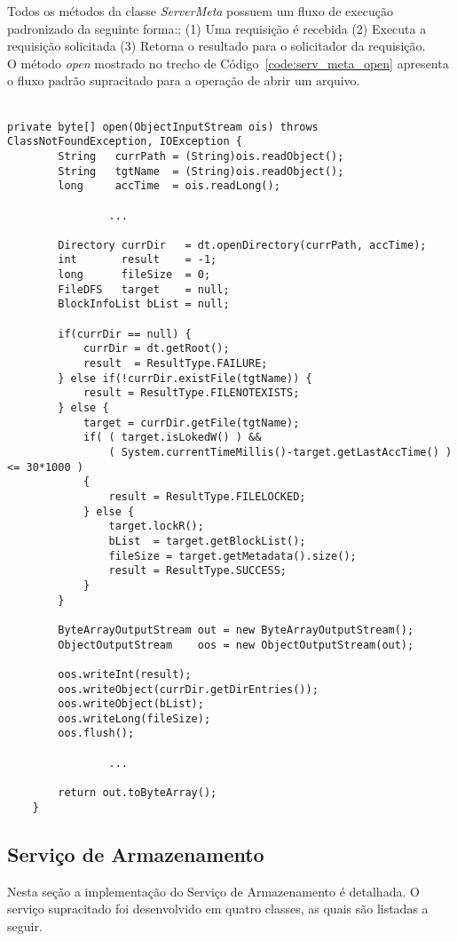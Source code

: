 Todos os métodos da classe \textit{ServerMeta} possuem um fluxo de execução padronizado da seguinte forma:;  (1) Uma requisição é recebida (2) Executa a requisição solicitada (3) Retorna o resultado para o solicitador da requisição. 
\\

O método \textit{open} mostrado no trecho de Código~\ref{code:serv_meta_open} apresenta o fluxo padrão supracitado para a operação de abrir um arquivo.
\\
\\

\begin{lstlisting}[basicstyle=\ttfamily\footnotesize, frame=single, caption=Exemplo de método da classe ServerMeta, label=code:serv_meta_open]		
	private byte[] open(ObjectInputStream ois) throws ClassNotFoundException, IOException {
		String   currPath = (String)ois.readObject();
		String   tgtName  = (String)ois.readObject();
		long     accTime  = ois.readLong();
		
				...
		
		Directory currDir   = dt.openDirectory(currPath, accTime);
		int       result    = -1;
		long      fileSize  = 0;
		FileDFS   target    = null;
		BlockInfoList bList = null;
		
		if(currDir == null) {
			currDir = dt.getRoot();
			result  = ResultType.FAILURE;
		} else if(!currDir.existFile(tgtName)) {
			result = ResultType.FILENOTEXISTS;
		} else {
			target = currDir.getFile(tgtName);
			if( ( target.isLokedW() ) &&
				( System.currentTimeMillis()-target.getLastAccTime() ) <= 30*1000 ) 
			{
				result = ResultType.FILELOCKED;
			} else {
				target.lockR();
				bList  = target.getBlockList();
				fileSize = target.getMetadata().size();
				result = ResultType.SUCCESS;
			}
		}
	
		ByteArrayOutputStream out = new ByteArrayOutputStream();
		ObjectOutputStream    oos = new ObjectOutputStream(out);
	
		oos.writeInt(result);
		oos.writeObject(currDir.getDirEntries());
		oos.writeObject(bList);
		oos.writeLong(fileSize);
		oos.flush();
		
				...
					
		return out.toByteArray();
	}
\end{lstlisting}


\subsection{Serviço de Armazenamento}
Nesta seção a implementação do Serviço de Armazenamento é detalhada. O serviço supracitado foi desenvolvido em quatro classes, as quais são listadas a seguir.
\\

